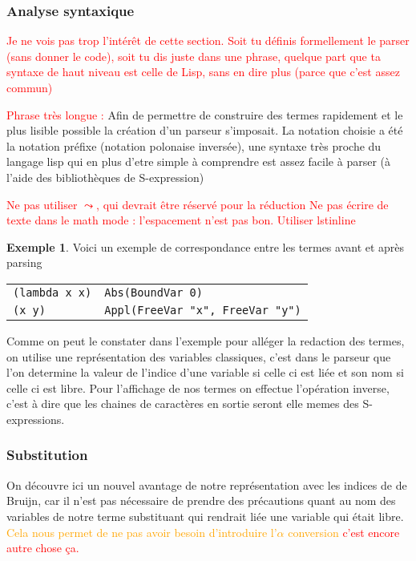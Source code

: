 \documentclass {article}
\theoremstyle{definition}
\newtheorem{example}{Exemple}
\theoremstyle{remark}
\newcommand{\todo}[1]{\textcolor{red}{#1}}
\newcommand{\attention}[1]{\textcolor{orange}{#1}}
\begin{document}
\subsubsection{Analyse syntaxique}

\todo{Je ne vois pas trop l'intérêt de cette section. Soit tu définis
  formellement le parser (sans donner le code), soit tu dis juste dans
  une phrase, quelque part que ta syntaxe de haut niveau est celle de
  Lisp, sans en dire plus (parce que c'est assez commun)}

\todo{Phrase très longue :}
Afin de permettre de construire des termes rapidement et le plus lisible 
possible la création d'un parseur s'imposait.
La notation choisie a été la notation préfixe (notation polonaise inversée),
une syntaxe très proche du langage lisp qui en plus d'etre simple à comprendre
est assez facile à parser (à l'aide des bibliothèques de S-expression)

\todo{Ne pas utiliser $\leadsto$, qui devrait être réservé pour la réduction}
\todo{Ne pas écrire de texte dans le math mode : l'espacement n'est pas bon. Utiliser lstinline}
\begin{example}
  Voici un exemple de correspondance entre les termes avant et après parsing

  \begin{tabular}{ll}
    \lstinline!(lambda x x)! & \lstinline!Abs(BoundVar 0)! \\
    \lstinline!(x y)! & \lstinline!Appl(FreeVar "x", FreeVar "y")!
  \end{tabular}
\end{example}

Comme on peut le constater dans l'exemple pour alléger la redaction des termes,
on utilise une représentation des variables classiques, c'est dans le parseur que 
l'on determine la valeur de l'indice d'une variable si celle ci est liée et son 
nom si celle ci est libre.
Pour l'affichage de nos termes on effectue l'opération inverse, c'est à dire que
les chaines de caractères en sortie seront elle memes des S-expressions.



\subsubsection{Substitution}

On découvre ici un nouvel avantage de notre représentation avec les indices de
de Bruijn, car il n'est pas nécessaire de prendre des précautions quant au
nom des variables de notre terme substituant %
qui rendrait liée une variable qui était libre. \attention{Cela nous permet de ne pas 
avoir besoin d'introduire l'\(\alpha\) conversion} \todo{c'est encore autre chose ça.}
\end{document}
